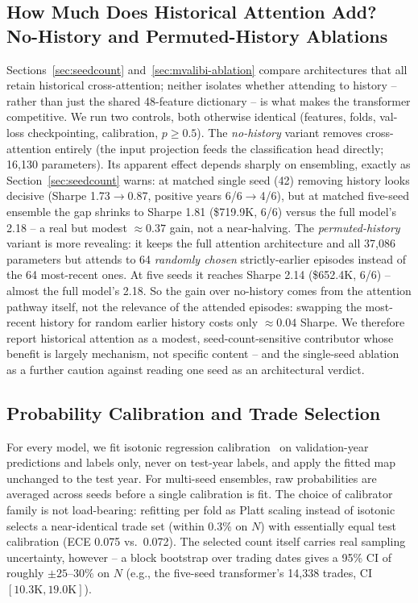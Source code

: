 \documentclass[sigconf,review]{acmart}
\begin{document}
\subsection{How Much Does Historical Attention Add? No-History and Permuted-History Ablations}
\label{sec:nohistory}
Sections~\ref{sec:seedcount} and~\ref{sec:mvalibi-ablation} compare architectures that all retain historical cross-attention; neither isolates whether attending to history -- rather than just the shared 48-feature dictionary -- is what makes the transformer competitive. We run two controls, both otherwise identical (features, folds, val-loss checkpointing, calibration, $p\ge0.5$). The \emph{no-history} variant removes cross-attention entirely (the input projection feeds the classification head directly; 16{,}130 parameters). Its apparent effect depends sharply on ensembling, exactly as Section~\ref{sec:seedcount} warns: at matched single seed (42) removing history looks decisive (Sharpe 1.73$\to$0.87, positive years 6/6$\to$4/6), but at matched five-seed ensemble the gap shrinks to Sharpe 1.81 (\$719.9K, 6/6) versus the full model's 2.18 -- a real but modest $\approx0.37$ gain, not a near-halving. The \emph{permuted-history} variant is more revealing: it keeps the full attention architecture and all 37{,}086 parameters but attends to 64 \emph{randomly chosen} strictly-earlier episodes instead of the 64 most-recent ones. At five seeds it reaches Sharpe 2.14 (\$652.4K, 6/6) -- almost the full model's 2.18. So the gain over no-history comes from the attention pathway itself, not the relevance of the attended episodes: swapping the most-recent history for random earlier history costs only $\approx0.04$ Sharpe. We therefore report historical attention as a modest, seed-count-sensitive contributor whose benefit is largely mechanism, not specific content -- and the single-seed ablation as a further caution against reading one seed as an architectural verdict.

\subsection{Probability Calibration and Trade Selection}
\label{sec:calibration}
For every model, we fit isotonic regression calibration~\cite{zadrozny2002transforming} on validation-year predictions and labels only, never on test-year labels, and apply the fitted map unchanged to the test year. For multi-seed ensembles, raw probabilities are averaged across seeds before a single calibration is fit. The choice of calibrator family is not load-bearing: refitting per fold as Platt scaling instead of isotonic selects a near-identical trade set (within 0.3\% on $N$) with essentially equal test calibration (ECE 0.075 vs.\ 0.072). The selected count itself carries real sampling uncertainty, however -- a block bootstrap over trading dates gives a 95\% CI of roughly $\pm25$--$30\%$ on $N$ (e.g., the five-seed transformer's 14{,}338 trades, CI $[10.3\text{K}, 19.0\text{K}]$).
\end{document}
